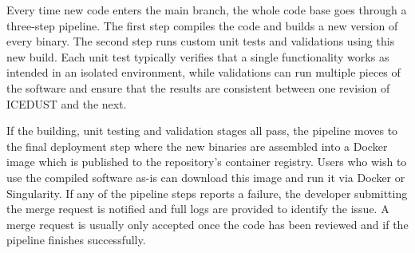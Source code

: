 Every time new code enters the main branch, the whole code base goes through a
three-step pipeline. The first step compiles the code and builds a new version
of every binary. The second step runs custom unit tests and validations using
this new build. Each unit test typically verifies that a single functionality
works as intended in an isolated environment, while validations can run multiple
pieces of the software and ensure that the results are consistent between one
revision of ICEDUST and the next.

If the building, unit testing and validation stages all pass, the pipeline moves to the final deployment step where the new binaries are assembled into a Docker image which is published to the repository's container registry. Users who wish to use the compiled software as-is can download this image and run it via Docker or Singularity.
If any of the pipeline steps reports a failure, the developer submitting the merge request is notified and full logs are provided to identify the issue. A merge request is usually only accepted once the code has been reviewed and if the pipeline finishes successfully.

